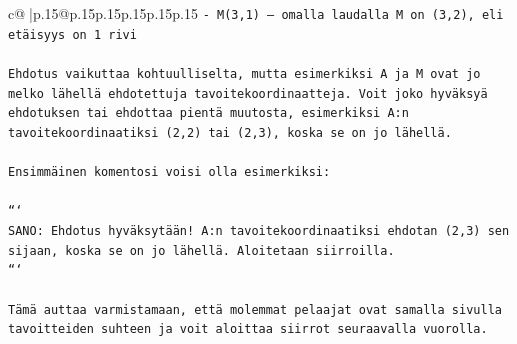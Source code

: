 \documentclass{article}
\begin{document}
{\begin{supertabular}{c@{$\;$}|p{.15\linewidth}@{}p{.15\linewidth}p{.15\linewidth}p{.15\linewidth}p{.15\linewidth}p{.15\linewidth}}
{{{\texttt{{-} M(3,1) – omalla laudalla M on (3,2), eli etäisyys on 1 rivi} \\
\\ 
\texttt{Ehdotus vaikuttaa kohtuulliselta, mutta esimerkiksi A ja M ovat jo melko lähellä ehdotettuja tavoitekoordinaatteja. Voit joko hyväksyä ehdotuksen tai ehdottaa pientä muutosta, esimerkiksi A:n tavoitekoordinaatiksi (2,2) tai (2,3), koska se on jo lähellä.} \\
\\ 
\texttt{Ensimmäinen komentosi voisi olla esimerkiksi:} \\
\\ 
\texttt{```} \\
\texttt{SANO: Ehdotus hyväksytään! A:n tavoitekoordinaatiksi ehdotan (2,3) sen sijaan, koska se on jo lähellä. Aloitetaan siirroilla.} \\
\texttt{```} \\
\\ 
\texttt{Tämä auttaa varmistamaan, että molemmat pelaajat ovat samalla sivulla tavoitteiden suhteen ja voit aloittaa siirrot seuraavalla vuorolla.} \\
            }
        }
    }
     \\ \\


\end{supertabular}}
\end{document}
